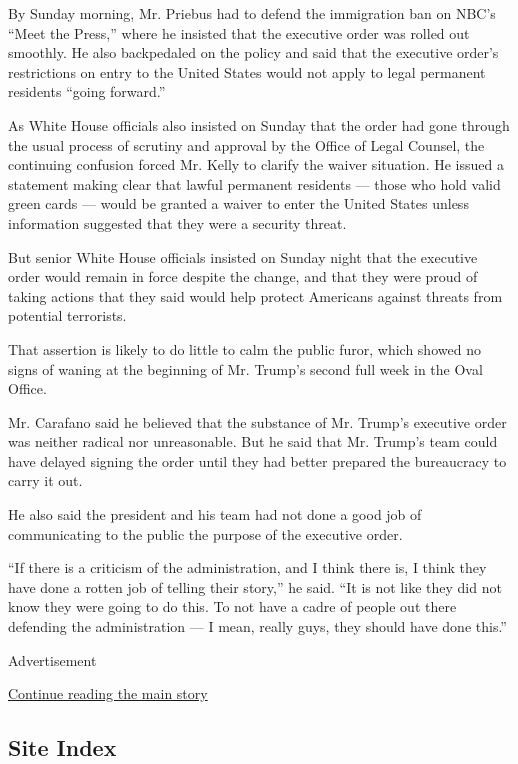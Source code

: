 By Sunday morning, Mr. Priebus had to defend the immigration ban on
NBC's ``Meet the Press,'' where he insisted that the executive order was
rolled out smoothly. He also backpedaled on the policy and said that the
executive order's restrictions on entry to the United States would not
apply to legal permanent residents ``going forward.''

As White House officials also insisted on Sunday that the order had gone
through the usual process of scrutiny and approval by the Office of
Legal Counsel, the continuing confusion forced Mr. Kelly to clarify the
waiver situation. He issued a statement making clear that lawful
permanent residents --- those who hold valid green cards --- would be
granted a waiver to enter the United States unless information suggested
that they were a security threat.

But senior White House officials insisted on Sunday night that the
executive order would remain in force despite the change, and that they
were proud of taking actions that they said would help protect Americans
against threats from potential terrorists.

That assertion is likely to do little to calm the public furor, which
showed no signs of waning at the beginning of Mr. Trump's second full
week in the Oval Office.

Mr. Carafano said he believed that the substance of Mr. Trump's
executive order was neither radical nor unreasonable. But he said that
Mr. Trump's team could have delayed signing the order until they had
better prepared the bureaucracy to carry it out.

He also said the president and his team had not done a good job of
communicating to the public the purpose of the executive order.

``If there is a criticism of the administration, and I think there is, I
think they have done a rotten job of telling their story,'' he said.
``It is not like they did not know they were going to do this. To not
have a cadre of people out there defending the administration --- I
mean, really guys, they should have done this.''

Advertisement

\protect\hyperlink{after-bottom}{Continue reading the main story}

\hypertarget{site-index}{%
\subsection{Site Index}\label{site-index}}


